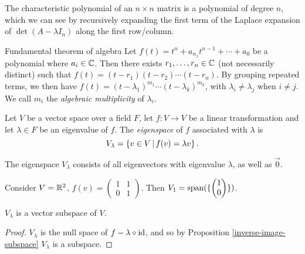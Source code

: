 \begin{rmk}
    The characteristic polynomial of an $n \times n$ matrix is a polynomial of degree $n$, which we can see by recursively expanding the first term of the Laplace expansion of $\det(A - \lambda I_n)$ along the first row/column.
\end{rmk}

\begin{thm}{Fundamental theorem of algebra}\label{algebra-fundamental-theorem}\proofbreak
    Let $f(t) = t^n + a_{n_1}t^{n-1} + \cdots + a_0$ be a polynomial where $a_i \in \mathbb{C}$. Then there exists $r_1, \ldots, r_n \in \mathbb{C}$ (not necessarily distinct) such that $f(t) = (t -r_1)(t-r_2)\cdots(t-r_n)$. By grouping repeated terms, we then have
    $f(t) = (t-\lambda_1)^{m_1}\cdots (t-\lambda_k)^{m_k}$, with $\lambda_i \neq \lambda_j$ when $i \neq j$. We call $m_i$ the \emph{algebraic multiplicity} of $\lambda_i$.
\end{thm}

\begin{defn}
    Let $V$ be a vector space over a field $F$, let $f: V \to V$ be a linear transformation and let $\lambda \in F$ be an eigenvalue of $f$. The \emph{eigenspace} of $f$ associated with $\lambda$ is
    \[V_{\lambda} = \left\{v \in V \,\middle|\, f(v) = \lambda v\right\}.\]
\end{defn}

\begin{rmk}
    The eigenspace $V_{\lambda}$ consists of all eigenvectors with eigenvalue $\lambda$, as well as $\vec{0}$.
\end{rmk}

\begin{exmp}
    Consider $V = \mathbb{R}^2$, $f(v) = \begin{pmatrix}1 & 1 \\ 0 & 1\end{pmatrix}$. Then $V_1 = \operatorname{span}(\{\begin{pmatrix}1 \\ 0\end{pmatrix}\})$.
\end{exmp}

\begin{lemma}\label{eigen-subspace}
    $V_{\lambda}$ is a vector subspace of $V$.
\end{lemma}

\begin{proof}
    $V_{\lambda}$ is the null space of $f - \lambda \circ \operatorname{id}$, and so by Proposition \ref{inverse-image-subspace} $V_{\lambda}$ is a subspace.
\end{proof}


